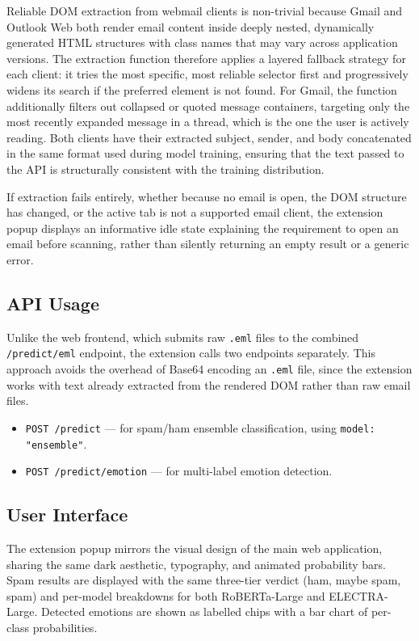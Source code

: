 Reliable DOM extraction from webmail clients is non-trivial because Gmail and Outlook Web both render email content inside deeply nested, dynamically generated \ac{HTML} structures with class names that may vary across application versions. The extraction function therefore applies a layered fallback strategy for each client: it tries the most specific, most reliable selector first and progressively widens its search if the preferred element is not found. For Gmail, the function additionally filters out collapsed or quoted message containers, targeting only the most recently expanded message in a thread, which is the one the user is actively reading. Both clients have their extracted subject, sender, and body concatenated in the same format used during model training, ensuring that the text passed to the \ac{API} is structurally consistent with the training distribution.

If extraction fails entirely, whether because no email is open, the DOM structure has changed, or the active tab is not a supported email client, the extension popup displays an informative idle state explaining the requirement to open an email before scanning, rather than silently returning an empty result or a generic error.

\subsection{API Usage}

Unlike the web frontend, which submits raw \texttt{.eml} files to the combined \texttt{/predict/eml} endpoint, the extension calls two endpoints separately. This approach avoids the overhead of Base64 encoding an \texttt{.eml} file, since the extension works with text already extracted from the rendered DOM rather than raw email files.

\begin{itemize}
    \item \texttt{POST /predict} — for spam/ham ensemble classification, using \texttt{model: "ensemble"}.
    \item \texttt{POST /predict/emotion} — for multi-label emotion detection.
\end{itemize}

\subsection{User Interface}

The extension popup mirrors the visual design of the main web application, sharing the same dark aesthetic, typography, and animated probability bars. Spam results are displayed with the same three-tier verdict (ham, maybe spam, spam) and per-model breakdowns for both \acs{RoBERTa}-Large and \acs{ELECTRA}-Large. Detected emotions are shown as labelled chips with a bar chart of per-class probabilities.


